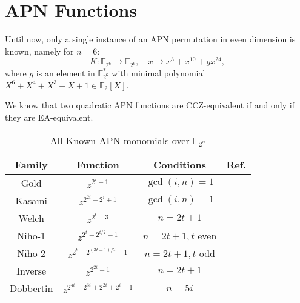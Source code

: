 \documentclass[8pt,oneside]{article}
\newcommand{\0}{\textbf{0}}
\newcommand{\1}{\textbf{1}}
\newcommand{\F}{\mathbb{F}}
\begin{document}
\section{APN Functions}
    Until now, only a single instance of an APN permutation in even dimension is known, namely for $ n = 6 $\cite{Browning2010sixbitAPN}: 
    \[K:\F_{2^6}\rightarrow\F_{2^6},\quad x\mapsto x^3+x^{10}+gx^{24},\]
    where $ g $ is an element in $ \F_{2^6}^* $ with minimal polynomial $ X^6+X^4+X^3 + X + 1\in \F_2[X] $. 

    We know that two quadratic APN functions are CCZ-equivalent if and only if they are EA-equivalent\cite{Yoshiara2012EAeqCCZ_quadAPN}.

    \begin{table}[!t]
        \caption{All Known APN monomials over $\F_{2^n}$} \label{APN monomials}
        \centering
        \small
        \begin{tabular}{c c cc }	
            \toprule
            Family   &	Function                       & Conditions        & Ref. \\
            \midrule
            Gold     &$ z^{2^i+1}$                     & $ \gcd(i,n)=1$    &  \cite{Gold1968goldfunction_APN_sequences} \\
            Kasami   &$ z^{2^{2i}-2^i+1}$              & $ \gcd(i,n)=1$    &  \cite{Kasami1971kasamifunction_APN_sequences} \\
            Welch    &$ z^{2^t+3}$                     & $ n=2t+1$         &  \cite{Dobbertin1999Welchfunction_APN_sequences} \\
            Niho-1   &$ z^{2^t+2^{t/2}-1}$             & $ n=2t+1, t$ even &  \cite{Dobbertin1999Nihofunction_APN_sequences} \\
            Niho-2   &$ z^{2^t+2^{(3t+1)/2}-1}$        & $ n=2t+1, t$ odd  &  \cite{Dobbertin1999Nihofunction_APN_sequences} \\
            Inverse  &$ z^{2^{2t}-1} $                 & $ n=2t+1$         &  \cite{Nyberg1993differential_and_inversefunction} \\
            Dobbertin&$ z^{2^{4i}+2^{3i}+2^{2i}+2^i-1}$& $ n=5i$           & \cite{Dobbertin2001dobbbertinAPN} \\
            \bottomrule
        \end{tabular}
    \end{table}
\end{document}
